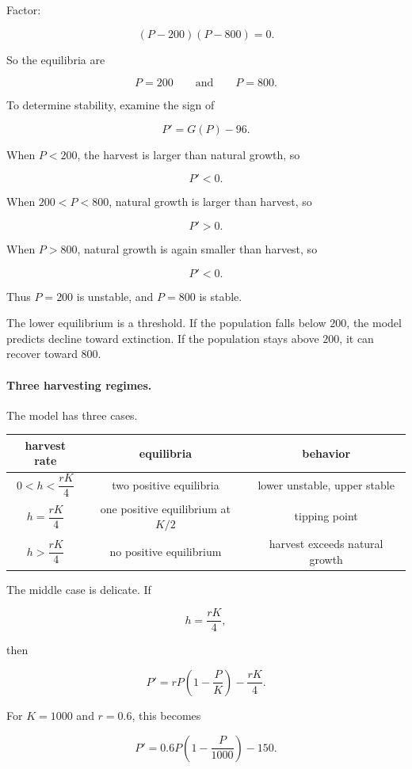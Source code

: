 Factor:

\[
(P-200)(P-800)=0.
\]

So the equilibria are

\[
P=200
\qquad\text{and}\qquad
P=800.
\]

To determine stability, examine the sign of

\[
P'=G(P)-96.
\]

When \(P<200\), the harvest is larger than natural growth, so

\[
P'<0.
\]

When \(200<P<800\), natural growth is larger than harvest, so

\[
P'>0.
\]

When \(P>800\), natural growth is again smaller than harvest, so

\[
P'<0.
\]

Thus \(P=200\) is unstable, and \(P=800\) is stable.

The lower equilibrium is a threshold.  If the population falls below \(200\), the model
predicts decline toward extinction.  If the population stays above \(200\), it can recover
toward \(800\).

\paragraph{Three harvesting regimes.}
The model has three cases.

\begin{center}
\begin{tabular}{c|c|c}
\textbf{harvest rate} & \textbf{equilibria} & \textbf{behavior} \\ \hline
\(0<h<\dfrac{rK}{4}\) & two positive equilibria & lower unstable, upper stable \\[8pt]
\(h=\dfrac{rK}{4}\) & one positive equilibrium at \(K/2\) & tipping point \\[8pt]
\(h>\dfrac{rK}{4}\) & no positive equilibrium & harvest exceeds natural growth
\end{tabular}
\end{center}

The middle case is delicate.  If

\[
h=\frac{rK}{4},
\]

then

\[
P'=rP\left(1-\frac{P}{K}\right)-\frac{rK}{4}.
\]

For \(K=1000\) and \(r=0.6\), this becomes

\[
P'=0.6P\left(1-\frac{P}{1000}\right)-150.
\]

